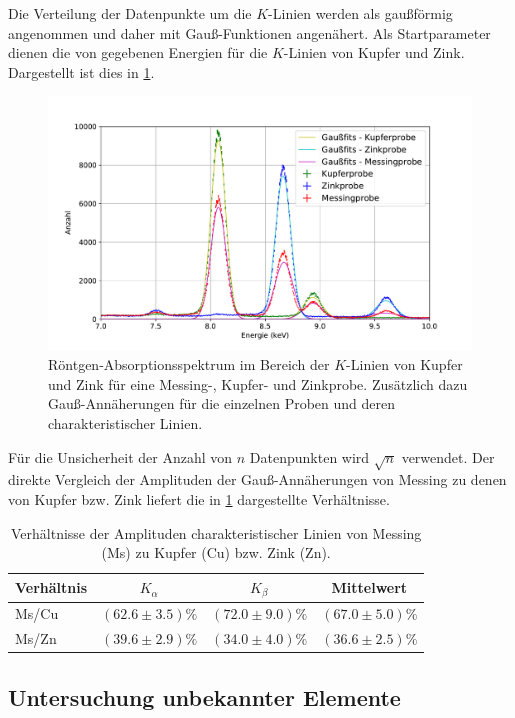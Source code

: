 	Die Verteilung der Datenpunkte um die $K$-Linien werden als gaußförmig angenommen und daher mit Gauß-Funktionen angenähert.
	Als Startparameter dienen die von \cite{brukerPTE} gegebenen Energien für die $K$-Linien von Kupfer und Zink.
	Dargestellt ist dies in \cref{fig:k-linien}.
	\begin{figure}[ht]
		\centering
		\includegraphics[width=.8\textwidth]{plots/KupferprobeK}
		\caption{Röntgen-Absorptionsspektrum im Bereich der $K$-Linien von Kupfer und Zink für eine Messing-, Kupfer- und Zinkprobe. Zusätzlich dazu Gauß-Annäherungen für die einzelnen Proben und deren charakteristischer Linien.}
		\label{fig:k-linien}
	\end{figure}
	Für die Unsicherheit der Anzahl von $n$ Datenpunkten wird $\sqrt{n}$ verwendet.
	Der direkte Vergleich der Amplituden der Gauß-Annäherungen von Messing zu denen von Kupfer bzw. Zink liefert die in \cref{tab:amplituden} dargestellte Verhältnisse.
	\begin{table}
		\centering
		\caption{Verhältnisse der Amplituden charakteristischer Linien von Messing (Ms) zu Kupfer (Cu) bzw. Zink (Zn).}
		\begin{tabular}{l|c|c|c}
			Verhältnis & $K_\alpha$ & $K_\beta$ & Mittelwert \\ \hline
			Ms/Cu & $(62.6\pm3.5)\%$ & $(72.0\pm9.0)\%$ & $(67.0\pm5.0)\%$ \\
			Ms/Zn & $(39.6\pm2.9)\%$ & $(34.0\pm4.0)\%$ & $(36.6\pm2.5)\%$ \\
		\end{tabular}
		\label{tab:amplituden}
	\end{table}

\subsection{Untersuchung unbekannter Elemente}

